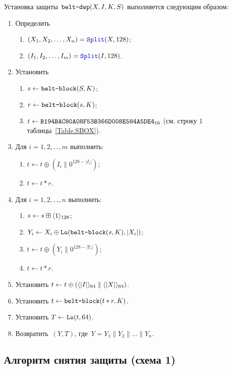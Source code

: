 Установка защиты~$\texttt{belt-dwp}(X,I,K,S)$ выполняется следующим образом:
\begin{enumerate}
\item
Определить 
\begin{enumerate}
\item
$(X_1,X_2,\ldots,X_n)=\mathop{\textcolor{blue}{\texttt{Split}}}\nolimits(X, 128)$;
\item
$(I_1,I_2,\ldots,I_m)=\mathop{\textcolor{blue}{\texttt{Split}}}\nolimits(I, 128)$. 
\end{enumerate}
\item
Установить
\begin{enumerate}
\item
$s\leftarrow\texttt{belt-block}(S,K)$;
\item
$r\leftarrow \texttt{belt-block}(s,K)$;
\item
$t\leftarrow\texttt{B194BAC80A08F53B366D008E584A5DE4}_{16}$
(см. строку 1 таблицы~\ref{Table.SBOX}).
\end{enumerate}

\item
Для $i=1,2,\ldots,m$ выполнить:
\begin{enumerate}
\item
$t\leftarrow t\oplus (I_i\parallel 0^{128-|I_i|})$;
\item
$t\leftarrow t\ast r$.
\end{enumerate}

\item
Для $i=1,2,\ldots,n$ выполнить:
\begin{enumerate}
\item
$s\leftarrow s\boxplus\langle1\rangle_{128}$;
\item
$Y_i\leftarrow X_i\oplus\mathop{\texttt{Lo}}\nolimits(\texttt{belt-block}(s,K), |X_i|)$;
\item
$t\leftarrow t\oplus (Y_i\parallel 0^{128-|Y_i|})$;
\item
$t\leftarrow t\ast r$.
\end{enumerate}

\item
Установить
$t\leftarrow t\oplus 
(\langle|I|\rangle_{64}\parallel\langle|X|\rangle_{64})$.
\item
Установить
$t\leftarrow \texttt{belt-block}(t\ast r,K)$.
\item
Установить
$T\leftarrow \mathop{\texttt{Lo}}\nolimits(t, 64)$.
\item
Возвратить~$(Y,T)$, 
где~$Y=Y_1\parallel Y_2\parallel\ldots\parallel Y_n$.
\end{enumerate}

\subsection{Алгоритм снятия защиты (схема 1)}\label{AE.DWP.Unwrap}

